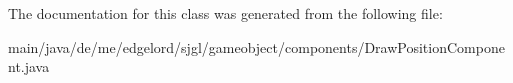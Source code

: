 The documentation for this class was generated from the following file\+:\begin{DoxyCompactItemize}
\item 
main/java/de/me/edgelord/sjgl/gameobject/components/Draw\+Position\+Component.\+java\end{DoxyCompactItemize}
